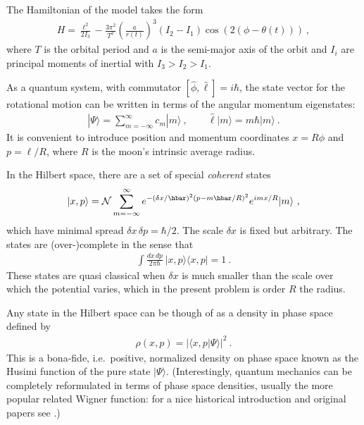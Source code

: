 \documentclass[12pt]{article}
\theoremstyle{plain}
\theoremstyle{definition}
\theoremstyle{remark}
\def\bra#1{\langle #1|}
\def\ket#1{| #1\rangle}
\newcommand{\EQ}[1]{\begin{equation}\begin{split} #1
\end{split}\end{equation}}
\begin{document}
The Hamiltonian of the model takes the form
\EQ{
H=\frac{\ell^2}{2I_3}-\frac{3\pi^2}{T^2}\left(\frac a{r(t)}\right)^3(I_2-I_1)\cos(2(\phi-\theta(t)))\ ,
\label{hham}
}
where $T$ is the orbital period and $a$ is the semi-major axis of the orbit and $I_i$ are principal moments of inertial with $I_3>I_2>I_1$.

As a quantum system, with commutator $[\hat\phi,\hat\ell]=i\hbar$, the state vector for the rotational motion can be written in terms of the angular momentum eigenstates:
\EQ{
\ket{\Psi}=\sum_{m=-\infty}^\infty c_m\ket{m}\ ,\qquad \hat\ell\ket{m}=m\hbar\ket{m}\ .
}
It is convenient to introduce position and momentum coordinates $x=R\phi$ and $p=\ell/R$, where $R$ is the moon's
intrinsic average radius.

In the Hilbert space, there are a set of special {\it coherent\/} states 
\EQ{
\ket{x,p}={\cal N}\sum_{m=-\infty}^\infty e^{-(\delta x/\hbar)^2(p -m\hbar/R)^2}e^{imx/R}\ket{m}\ ,
}
which have minimal spread $\delta x\,\delta p=\hbar/2$. The scale $\delta x$ is fixed but arbitrary. The states are (over-)complete in the sense that
\EQ{
\int \frac{dx\,dp}{2\pi\hbar}\,\ket{x,p}\bra{x,p}=1\ .
\label{zza}
}
These states are quasi classical when $\delta x$ is much smaller than the scale over which the potential varies, which in the present problem is order $R$ the radius.

Any state in the Hilbert space can be though of as a density in phase space defined by
\EQ{
\rho(x,p)=\big|\bra{x,p}\Psi\rangle\big|^2\ .
}
This is a bona-fide, i.e.~positive, normalized density on phase space known as the Husimi function \cite{Husimi} of the pure state $\ket{\Psi}$. (Interestingly, quantum mechanics can be completely reformulated in terms of phase space densities, usually the more popular related Wigner function: for a nice historical introduction and original papers see \cite{ZFC}.)
\end{document}
